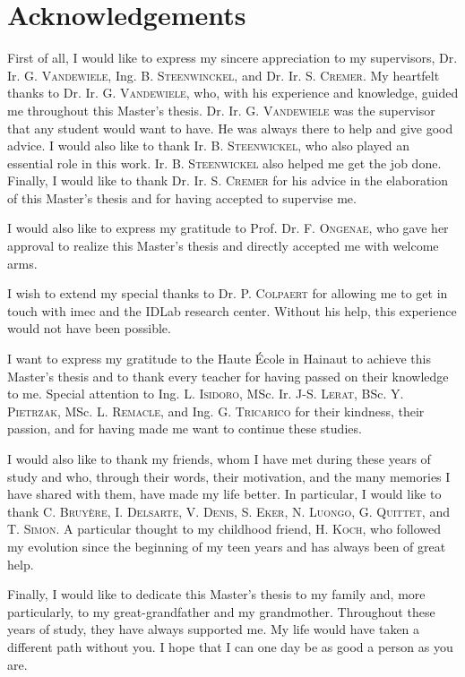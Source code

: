 
\chapter*{Acknowledgements}
\label{chap:acknowledgements}

First of all, I would like to express my sincere appreciation to my supervisors,
Dr. Ir. G. \textsc{Vandewiele}, Ing. B. \textsc{Steenwinckel}, and Dr. Ir.
S. \textsc{Cremer}. My heartfelt thanks to Dr. Ir. G. \textsc{Vandewiele}, who,
with his experience and knowledge, guided me throughout this Master's
thesis. Dr. Ir. G. \textsc{Vandewiele} was the supervisor that any student
would want to have. He was always there to help and give good advice. I would
also like to thank Ir. B. \textsc{Steenwickel}, who also played an essential
role in this work. Ir. B. \textsc{Steenwickel} also helped me get the job
done. Finally, I would like to thank Dr. Ir. S. \textsc{Cremer} for his advice
in the elaboration of this Master's thesis and for having accepted to supervise
me.

\medskip

\noindent I would also like to express my gratitude to
Prof. Dr. F. \textsc{Ongenae}, who gave her approval to realize this Master's
thesis and directly accepted me with welcome arms.

\medskip

\noindent I wish to extend my special thanks to Dr. P. \textsc{Colpaert} for
allowing me to get in touch with imec and the IDLab research center. Without his
help, this experience would not have been possible.

\medskip

\noindent I want to express my gratitude to the Haute École in Hainaut to
achieve this Master's thesis and to thank every teacher for having passed on
their knowledge to me. Special attention to Ing. L. \textsc{Isidoro},
MSc. Ir. J-S. \textsc{Lerat}, BSc. Y. \textsc{Pietrzak},
MSc. L. \textsc{Remacle}, and Ing. G. \textsc{Tricarico} for their kindness,
their passion, and for having made me want to continue these studies.

\medskip

\noindent I would also like to thank my friends, whom I have met during these
years of study and who, through their words, their motivation, and the many
memories I have shared with them, have made my life better. In particular, I
would like to thank C. \textsc{Bruyère}, I. \textsc{Delsarte},
V. \textsc{Denis}, S. \textsc{Eker}, N. \textsc{Luongo}, G. \textsc{Quittet},
and T. \textsc{Simon}. A particular thought to my childhood friend,
H. \textsc{Koch}, who followed my evolution since the beginning of my teen years
and has always been of great help.

\medskip

\noindent Finally, I would like to dedicate this Master's thesis to my family
and, more particularly, to my great-grandfather and my grandmother. Throughout
these years of study, they have always supported me. My life would have taken a
different path without you. I hope that I can one day be as good a person as you
are.

\thispagestyle{empty}
\clearpage

